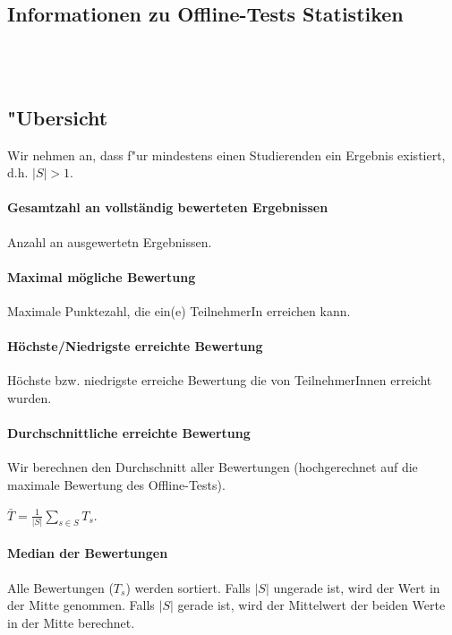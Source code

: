 \documentclass[12pt]{report}
\begin{document}
\subsection{Informationen zu Offline-Tests Statistiken}

\ \\
\ \\

\subsection{"Ubersicht}
\label{subsubsec:overview}

Wir nehmen an, dass f"ur mindestens einen Studierenden ein Ergebnis existiert, d.h. $|S|>1$.

\paragraph{Gesamtzahl an vollständig bewerteten Ergebnissen}
Anzahl an ausgewertetn Ergebnissen.

\paragraph{Maximal mögliche Bewertung}
Maximale Punktezahl, die ein(e) TeilnehmerIn erreichen kann.

\paragraph{Höchste/Niedrigste erreichte Bewertung}
Höchste bzw. niedrigste erreiche Bewertung die von TeilnehmerInnen erreicht wurden.

\paragraph{Durchschnittliche erreichte Bewertung}
Wir berechnen den Durchschnitt aller Bewertungen (hochgerechnet auf die maximale Bewertung des Offline-Tests).

$\bar{T}=\frac{1}{|S|}\sum\limits_{s\in S}T_s$.

\paragraph{Median der Bewertungen}
Alle Bewertungen ($T_s$) werden sortiert. Falls $|S|$ ungerade ist, wird der Wert in der Mitte genommen. Falls $|S|$ gerade ist, wird der Mittelwert der beiden Werte in der Mitte berechnet. 
\end{document}
